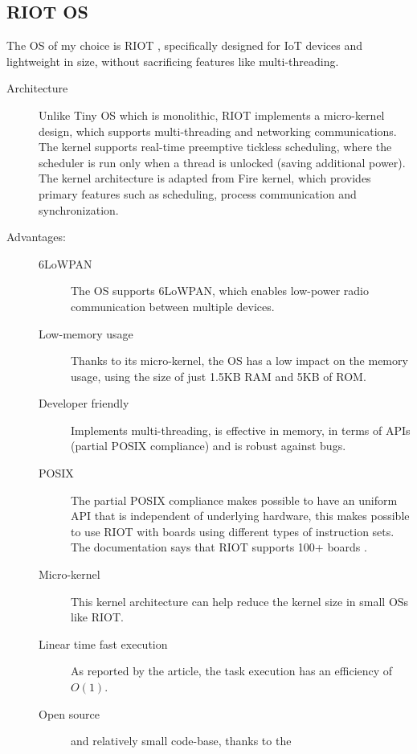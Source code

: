 \documentclass[a4paper, 12pt]{article}
\begin{document}
\begin{exercise}
    
\end{exercise}

\begin{exercise}
\subsection{RIOT OS} %
\label{sub:RIOT_oS}
The OS of my choice is RIOT \cite{8320780}, specifically designed for IoT devices and
lightweight in size, without sacrificing features like multi-threading.

\begin{description}
    \item[Architecture] Unlike Tiny OS which is monolithic, RIOT implements a
		micro-kernel design, which supports multi-threading and networking
		communications. The kernel supports real-time preemptive tickless scheduling, where
		the scheduler is run only when a thread is unlocked (saving additional
		power). \\
		The kernel architecture is adapted from Fire kernel, which provides
		primary features such as scheduling, process communication and
		synchronization. 
	\item[Advantages:]
		\begin{description}
		    \item[6LoWPAN] The OS supports 6LoWPAN, which enables 
				low-power radio communication between multiple devices.
			\item[Low-memory usage] Thanks to its micro-kernel, the OS has a
				low impact on the memory usage, using the size of just 1.5KB RAM
				and 5KB of ROM.  
			\item[Developer friendly] Implements multi-threading, is effective
				in memory, in terms of APIs (partial POSIX compliance) and is robust against bugs.
			\item[POSIX] The partial POSIX compliance makes possible to have an
				uniform API that is independent of underlying hardware, this
				makes possible to use RIOT with boards using different types of
				instruction sets. The documentation says that RIOT supports 100+
				boards \cite{riot-os_2021}.
			\item[Micro-kernel] This kernel architecture can help reduce the
				kernel size in small OSs like RIOT. 
			\item[Linear time fast execution] As reported by the article, the
				task execution has an efficiency of $O(1)$.
			\item[Open source] and relatively small code-base, thanks to the

\end{description}
\end{description}
\end{exercise}
\end{document}
